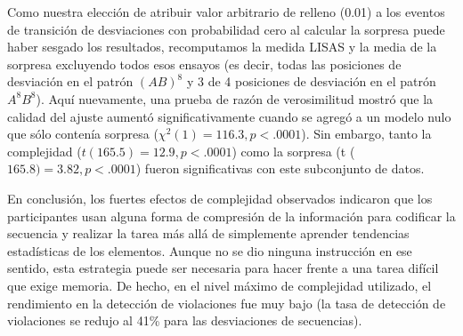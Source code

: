 Como nuestra elección de atribuir valor arbitrario de relleno (0.01) a los eventos de transición de desviaciones con probabilidad cero al calcular la sorpresa puede haber sesgado los resultados, recomputamos la medida LISAS y la media de la sorpresa excluyendo todos esos ensayos (es decir, todas las posiciones de desviación en el patrón $(AB)^8$ y 3 de 4 posiciones de desviación en el patrón $A^8 B^8$). Aquí nuevamente, una prueba de razón de verosimilitud mostró que la calidad del ajuste aumentó significativamente cuando se agregó \mdlbin a un modelo nulo que sólo contenía sorpresa ($\chi^2(1) = 116.3, p < .0001$). Sin embargo, tanto la complejidad ($t (165.5) = 12.9, p < .0001$) como la sorpresa (t ($165.8) = 3.82, p < .0001$) fueron significativas con este subconjunto de datos. 


En conclusión, los fuertes efectos de complejidad observados indicaron que los participantes usan alguna forma de compresión de la información para codificar la secuencia y realizar la tarea más allá de simplemente aprender tendencias estadísticas de los elementos. Aunque no se dio ninguna instrucción en ese sentido, esta estrategia puede ser necesaria para hacer frente a una tarea difícil que exige memoria. De hecho, en el nivel máximo de complejidad utilizado, el rendimiento en la detección de violaciones fue muy bajo (la tasa de detección de violaciones se redujo al 41\% para las desviaciones de secuencias).


